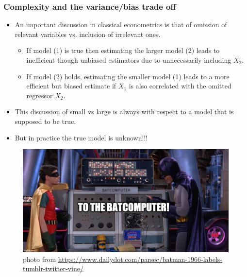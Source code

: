\documentclass[
  shownotes,
  xcolor={svgnames},
  hyperref={colorlinks,citecolor=DarkBlue,linkcolor=andesred,urlcolor=DarkBlue}
  , aspectratio=169]{beamer}
\begin{document}
\begin{frame}
\frametitle{Complexity and the variance/bias trade off}

\begin{itemize}
  \item An important discussion in classical econometrics is that of omission of relevant variables vs. inclusion of irrelevant ones. 
  \medskip
  \begin{itemize}
    \item If model (1) is true then estimating the larger model (2) leads to inefficient though unbiased estimators due to unnecessarily including $X_2$.
    \medskip 
    \item If model (2) holds, estimating the smaller model (1) leads to a more efficient but biased estimate if $X_1$ is also correlated with the omitted regressor $X_2$. 
  \end{itemize}
  \bigskip
  \item This discussion of small vs large is always with respect to a model that is supposed to be true.
  \bigskip
\item  But in practice the true model is unknown!!!
\bigskip
\end{itemize}

\end{frame}
\begin{frame}

\begin{figure}[H] \centering
  \centering
  \includegraphics[scale=0.35]{figures/baticomputer_meme.jpg}
  \\
  \tiny photo from \url{https://www.dailydot.com/parsec/batman-1966-labels-tumblr-twitter-vine/}
\end{figure}


\end{frame}
\end{document}
